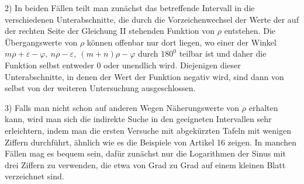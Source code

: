 2) In beiden Fällen teilt man zunächst das betreffende Intervall in die verschiedenen Unterabschnitte, die durch die Vorzeichenwechsel der Werte der auf der rechten Seite der Gleichung II stehenden Funktion von $\rho$ entstehen. Die Übergangswerte von $\rho$ können offenbar nur dort liegen, wo einer der Winkel $m\rho+\varepsilon-\varphi,\ n\rho-\varepsilon,\ (m+n)\rho-\varphi$ durch $180^{0}$ teilbar ist und daher die Funktion selbst entweder $0$ oder unendlich wird. Diejenigen dieser Unterabschnitte, in denen der Wert der Funktion negativ wird, sind dann von selbst von der weiteren Untersuchung ausgeschlossen.

3) Falls man nicht schon auf anderen Wegen Näherungswerte von $\rho$ erhalten kann, wird man sich die indirekte Suche in den geeigneten Intervallen sehr erleichtern, indem man die ersten Versuche mit abgekürzten Tafeln mit wenigen Ziffern durchführt, ähnlich wie es die Beispiele von Artikel 16 zeigen. In manchen Fällen mag es bequem sein,
dafür zunächst nur die Logarithmen der Sinus mit drei Ziffern zu verwenden, die etwa von Grad zu Grad auf einem kleinen Blatt verzeichnet sind.

